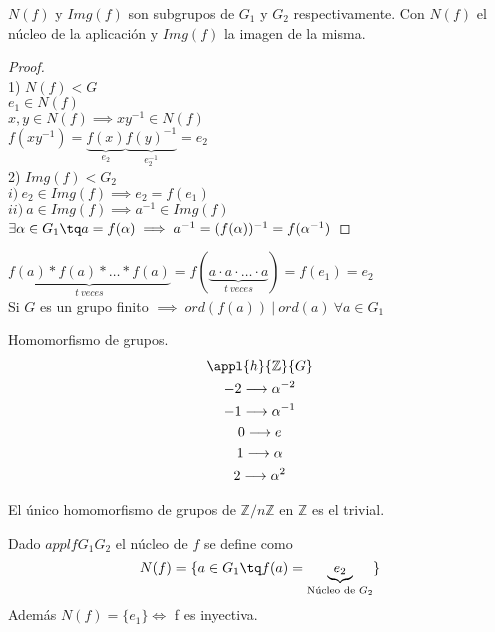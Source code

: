 \documentclass[a4paper,10pt]{apuntes}
\newenvironment{example}[1][Ejemplo]{\begin{trivlist}
\item[\hskip \labelsep {\bfseries #1}]}{\end{trivlist}}
\begin{document}
 \begin{theorem}
 $N(f)$ y $Img(f)$ son subgrupos de $G_1$ y $G_2$ respectivamente.
 Con $N(f)$ el núcleo de la aplicación y $Img(f)$ la imagen de la misma.
 \end{theorem}
 \begin{proof}\\
 1) $N(f) < G$\\
 $e_1 \in N(f)$\\ $x, y \in N(f) \implies xy^{-1}\in N(f)$\\
 $f(xy^{-1}) = \underbrace{f(x)}_{e_2} \underbrace{f(y)^{-1}}_{e_2^{-1}} = e_2$\\
 2) $Img(f) < G_2$\\
 $i)\ e_2\in Img(f) \implies e_2 = f(e_1)$\\
 $ii)\ a\in Img(f) \implies a^{-1}\in Img(f)$\\
 $\exists \alpha \in G_1 \tq a=f(\alpha ) \implies a^{-1} = (f(\alpha ))^{-1} = f(\alpha ^{-1})$
 \end{proof}

\obs $\underbrace{f(a) \ast f(a) \ast \hdots \ast f(a)}_{t\ veces} = f(\underbrace{a \cdot a \cdot \hdots \cdot a}_{t\ veces}) = f(e_1) = e_2$\\ Si $G$ es un grupo finito $\implies\ ord(f(a))\ |\ ord(a)\ \forall a \in G_1$

\begin{example} Homomorfismo de grupos.\\
\begin{gather*}
\appl{h}{\mathbb{Z}}{G}\\
-2 \longrightarrow \alpha ^{-2}\\
-1 \longrightarrow \alpha ^{-1}\\
0 \longrightarrow e\\
1 \longrightarrow \alpha\\
2 \longrightarrow \alpha ^{2}\\
\end{gather*}
\end{example}

\obs El único homomorfismo de grupos de $\mathbb{Z}/n\mathbb{Z}$ en $\mathbb{Z}$ es el trivial.\\

\begin{defn}
Dado $appl{f}{G_1}{G_2}$ el núcleo de $f$ se define como\\
$$N(f) = \{ a\in G_1 \tq f(a) = \underbrace{e_2}_{\text{Núcleo de } G_2}\} $$
Además $N(f) = \{ e_1 \} \iff$ f es inyectiva.
\end{defn}
\end{document}
